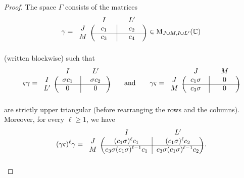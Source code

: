 \documentclass[ALCO,Unicode]{cedram}
\newcommand{\Mat}{\mathrm{M}}
\newcommand{\mC}{\mathbb{C}}
\begin{document}
\begin{proof}
The space $\Gamma$ consists of the matrices
\begin{equation}
\label{gamma}
\gamma=\begin{blockarray}{ccc}
{} & {\quad I\quad} & {\quad L'\quad}\\
\begin{block}{c(c|c)}
J & c_1 & c_2\\
\cline{2-3}
M & c_3 & c_4\\ \end{block}
\end{blockarray}
\,\in \Mat_{J\cup M,I\cup L'}(\mC)
\end{equation}
(written blockwise) such that
\begin{equation}
\label{zeta-gamma}
\varsigma \gamma=\begin{blockarray}{ccc}
{} & {\quad I\quad} & {\quad L'\quad}\\
\begin{block}{c(c|c)}
I & \sigma c_1 & \sigma c_2\\
\cline{2-3}
L' & 0 & 0\\ \end{block}
\end{blockarray}
\qquad\mbox{and}\qquad \gamma\varsigma=\begin{blockarray}{ccc}
{} & {\quad J\quad} & {\quad M\quad}\\
\begin{block}{c(c|c)}
J & c_1\sigma & 0\\
\cline{2-3}
M & c_3\sigma & 0\\ \end{block}
\end{blockarray}\end{equation}
are strictly upper triangular (before rearranging the rows and the columns).
Moreover, for every $\ell\geq 1$, we have
\begin{equation}
\label{powers2}
(\gamma\varsigma)^\ell\gamma=\begin{blockarray}{ccc}
{} & {\quad I\quad} & {\quad L'\quad}\\
\begin{block}{c(c|c)}
J & (c_1\sigma)^\ell c_1 & (c_1\sigma)^\ell c_2\\
\cline{2-3}
M & c_3\sigma(c_1\sigma)^{\ell-1}c_1 & c_3\sigma(c_1\sigma)^{\ell-1}c_2\\ \end{block}
\end{blockarray}\,.
\end{equation}


\end{proof}
\end{document}
